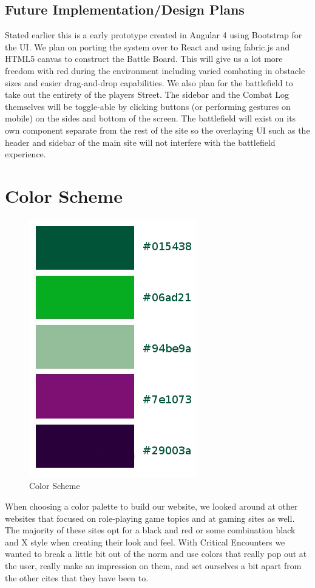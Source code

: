 \documentclass[12pt,a4paper]{report}
\begin{document}
\subsection {Future Implementation/Design Plans }
Stated earlier this is a early prototype created in Angular 4 using Bootstrap for the UI. We plan on porting the system over to React and using fabric.js and HTML5 canvas to construct the Battle Board. This will give us a lot more freedom with red during the environment including varied combating in obstacle sizes and easier drag-and-drop capabilities. We also plan for the battlefield to take out the entirety of the players Street. The sidebar and the Combat Log themselves will be toggle-able by clicking buttons (or performing gestures on mobile) on the sides and bottom of the screen. The battlefield will exist on its own component separate from the rest of the site so the overlaying UI such as the header and sidebar of the main site will not interfere with the battlefield experience.
	\newpage
	\section{Color Scheme}
	\begin{figure}[H]
		\centering
		\includegraphics[scale=.5]{colors}
		\caption{Color Scheme}
		\label{fig: Color Scheme}
	\end{figure}
	When choosing a color palette to build our website, we looked around at other websites that focused on role-playing game topics and at gaming sites as well. The majority of these sites opt for a black and red or some combination black and X style when creating their look and feel. With Critical Encounters we wanted to break a little bit out of the norm and use colors that really pop out at the user, really make an impression on them, and set ourselves a bit apart from the other cites that they have been to.
	\newpage
\end{document}
